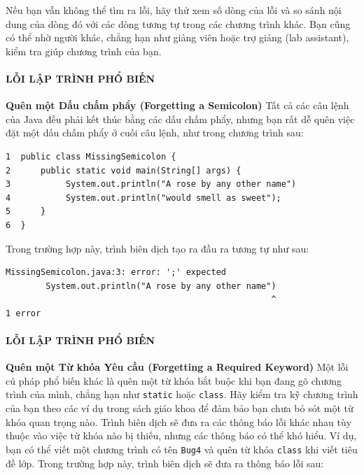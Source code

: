 Nếu bạn vẫn không thể tìm ra lỗi, hãy thử xem số dòng của lỗi và so sánh
nội dung của dòng đó với các dòng tương tự trong các chương trình khác.
Bạn cũng có thể nhờ người khác, chẳng hạn như giảng viên hoặc trợ giảng
(lab assistant), kiểm tra giúp chương trình của bạn.

\paragraph{LỖI LẬP TRÌNH PHỔ
BIẾN}\label{lux1ed7i-lux1eadp-truxecnh-phux1ed5-biux1ebfn-2}

\textbf{Quên một Dấu chấm phẩy (Forgetting a Semicolon)} Tất cả các câu
lệnh của Java đều phải kết thúc bằng các dấu chấm phẩy, nhưng bạn rất dễ
quên việc đặt một dấu chấm phẩy ở cuối câu lệnh, như trong chương trình
sau:

\begin{verbatim}
1  public class MissingSemicolon {
2      public static void main(String[] args) {
3           System.out.println("A rose by any other name")
4           System.out.println("would smell as sweet");
5      }
6  }
\end{verbatim}

Trong trường hợp này, trình biên dịch tạo ra đầu ra tương tự như sau:

\begin{verbatim}
MissingSemicolon.java:3: error: ';' expected 
        System.out.println("A rose by any other name") 
                                                     ^ 
1 error
\end{verbatim}

\paragraph{LỖI LẬP TRÌNH PHỔ
BIẾN}\label{lux1ed7i-lux1eadp-truxecnh-phux1ed5-biux1ebfn-3}

\textbf{Quên một Từ khóa Yêu cầu (Forgetting a Required Keyword)} Một
lỗi cú pháp phổ biến khác là quên một từ khóa bắt buộc khi bạn đang gõ
chương trình của mình, chẳng hạn như \texttt{static} hoặc
\texttt{class}. Hãy kiểm tra kỹ chương trình của bạn theo các ví dụ
trong sách giáo khoa để đảm bảo bạn chưa bỏ sót một từ khóa quan trọng
nào. Trình biên dịch sẽ đưa ra các thông báo lỗi khác nhau tùy thuộc vào
việc từ khóa nào bị thiếu, nhưng các thông báo có thể khó hiểu. Ví dụ,
bạn có thể viết một chương trình có tên \texttt{Bug4} và quên từ khóa
\texttt{class} khi viết tiêu đề lớp. Trong trường hợp này, trình biên
dịch sẽ đưa ra thông báo lỗi sau:

